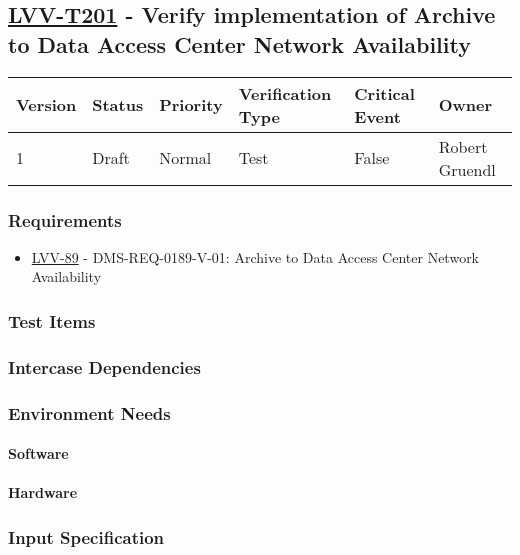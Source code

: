 \subsection{\href{https://jira.lsstcorp.org/secure/Tests.jspa\#/testCase/LVV-T201}{LVV-T201}
    - Verify implementation of Archive to Data Access Center Network Availability}\label{lvv-t201}

\begin{longtable}[]{llllll}
\toprule
Version & Status & Priority & Verification Type & Critical Event & Owner
\\\midrule
1 & Draft & Normal &
Test & False & Robert Gruendl
\\\bottomrule
\end{longtable}

\subsubsection{Requirements}
\begin{itemize}
\item \href{https://jira.lsstcorp.org/browse/LVV-89}{LVV-89} - DMS-REQ-0189-V-01: Archive to Data Access Center Network Availability
\end{itemize}

\subsubsection{Test Items}




\subsubsection{Intercase Dependencies}

\subsubsection{Environment Needs}

\paragraph{Software}

\paragraph{Hardware}

\subsubsection{Input Specification}

